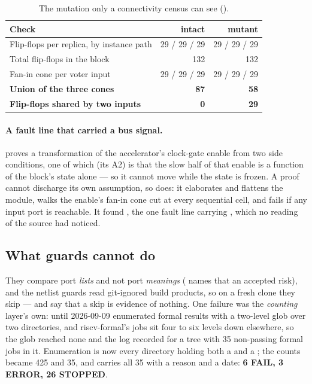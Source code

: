 \begin{table}[tbp]
\centering
\caption{The mutation only a connectivity census can see ().}
\label{tab:verif-cone}
\small
\begin{tabular}{@{}lrr@{}}
\toprule
Check & intact & mutant \\
\midrule
Flip-flops per replica, by instance path & 29 / 29 / 29 & 29 / 29 / 29 \\
Total flip-flops in the block            & 132          & 132 \\
Fan-in cone per voter input              & 29 / 29 / 29 & 29 / 29 / 29 \\
\textbf{Union of the three cones}        & \textbf{87}  & \textbf{58} \\
\textbf{Flip-flops shared by two inputs} & \textbf{0}   & \textbf{29} \\
\bottomrule
\end{tabular}
\end{table}

\paragraph{A fault line that carried a bus signal.}
 proves a transformation of the accelerator's clock-gate enable from two side conditions, one of which (its A2) is that the slow half of that enable is a function of the block's state alone --- so it cannot move while the state is frozen. A proof cannot discharge its own assumption, so  does: it elaborates and flattens the module, walks the enable's fan-in cone cut at every sequential cell, and fails if any input port is reachable. It found , the one fault line carrying , which no reading of the source had noticed.

\subsection{What guards cannot do}

They compare port \emph{lists} and not port \emph{meanings} ( names that an accepted risk), and the netlist guards read git-ignored build products, so on a fresh clone they skip --- and say that a skip is evidence of nothing. One failure was the \emph{counting} layer's own: until 2026-09-09  enumerated formal results with a two-level glob over two directories, and riscv-formal's jobs sit four to six levels down elsewhere, so the glob reached none and the log recorded  for a tree with 35 non-passing formal jobs in it. Enumeration is now every directory holding both a  and a ; the counts became 425 and 35, and  carries all 35 with a reason and a date: \textbf{6 FAIL, 3 ERROR, 26 STOPPED}.

